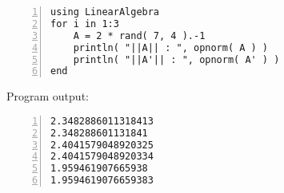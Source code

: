 \documentclass[ 12pt ]{article}
\begin{document}
\begin{lstlisting}[basicstyle=\ttfamily\footnotesize, numbers=left, tabsize=4, frame=single]
using LinearAlgebra
for i in 1:3
	A = 2 * rand( 7, 4 ).-1
	println( "||A|| : ", opnorm( A ) )
	println( "||A'|| : ", opnorm( A' ) )
end
\end{lstlisting}

Program output:
\begin{lstlisting}[basicstyle=\ttfamily\footnotesize, numbers=left, tabsize=4, frame=single]
2.3482886011318413
2.348288601131841
2.4041579048920325
2.4041579048920334
1.959461907665938
1.9594619076659383
\end{lstlisting}
\end{document}

